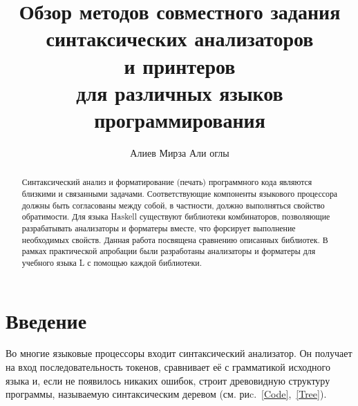 \lstset{language=Haskell}

\title{Обзор методов совместного задания\\
синтаксических анализаторов\\ 
и принтеров\\
для различных языков\\
программирования}


\author{Алиев Мирза Али оглы}



\maketitle             

\begin{abstract}
Синтаксический анализ и форматирование (печать)
программного кода являются близкими и связанными задачами.
Соответствующие компоненты языкового процессора должны быть
согласованы между собой, в частности, должно выполняться
свойство обратимости. Для языка Haskell существуют
библиотеки комбинаторов, позволяющие разрабатывать анализаторы и
форматеры вместе, что форсирует выполнение необходимых свойств.
Данная работа посвящена сравнению описанных библиотек. В рамках
практической апробации были разработаны анализаторы и форматеры
для учебного языка L с помощью каждой библиотеки.

\end{abstract}

\section*{Введение}

Во многие языковые процессоры входит синтаксический анализатор. Он получает на вход 
последовательность токенов, сравнивает её с грамматикой исходного языка и, если не 
появилось никаких ошибок, строит древовидную структуру программы, называемую 
синтаксическим деревом (см. риc.~\ref{Code},~\ref{Tree}).


